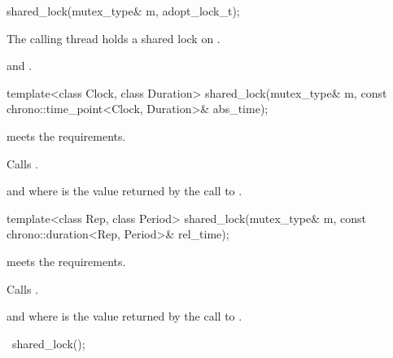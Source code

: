 %
\begin{itemdecl}
shared_lock(mutex_type& m, adopt_lock_t);
\end{itemdecl}

\begin{itemdescr}
\pnum
\expects
The calling thread holds a shared lock on .

\pnum
\ensures
{} and .
\end{itemdescr}

%
\begin{itemdecl}
template<class Clock, class Duration>
  shared_lock(mutex_type& m,
              const chrono::time_point<Clock, Duration>& abs_time);
\end{itemdecl}

\begin{itemdescr}
\pnum
\expects
{} meets the 
requirements.

\pnum
\effects
Calls .

\pnum
\ensures
{} and 
where 
is the value returned by the call to .
\end{itemdescr}

%
\begin{itemdecl}
template<class Rep, class Period>
  shared_lock(mutex_type& m,
              const chrono::duration<Rep, Period>& rel_time);
\end{itemdecl}

\begin{itemdescr}
\pnum
\expects
{} meets the 
requirements.

\pnum
\effects
Calls .

\pnum
\ensures
{} and 
where  is
the value returned by the call to .
\end{itemdescr}

%
\begin{itemdecl}
~shared_lock();
\end{itemdecl}

